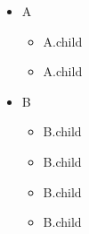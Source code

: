 \begin{itemize}
    \item A
    \begin{itemize}
        \item A.child

        \item A.child
    \end{itemize}

    \item B
    \begin{itemize}
        \item B.child

        \item B.child

        \item B.child
        \item B.child

    \end{itemize}
\end{itemize}
